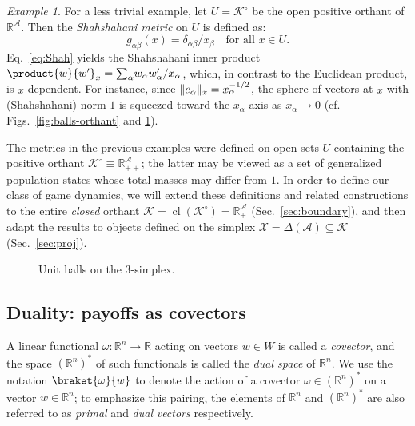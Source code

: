 \documentclass[reqno]{amsart}
\DeclarePairedDelimiter{\norm}{\lVert}{\rVert}
\theoremstyle{plain}
\theoremstyle{definition}
\theoremstyle{remark}
\newtheorem{example}[theorem]{Example}
\numberwithin{equation}{section}
\numberwithin{theorem}{section}
\begin{document}
\begin{example}
\label{ex:Shah}
For a less trivial example, let ${U} = {{\mathcal{K}}^{\circ}}$ be the open positive orthant of ${\mathbb{R}}^{\mathcal{A}}$.
Then the \emph{Shahshahani metric} on ${U}$ is defined as:
\begin{equation}
\label{eq:Shah}
g_{\alpha\beta}(x)
	= \delta_{\alpha\beta}/x_{\beta}
	\quad
	\text{for all $x\in{U}$}.
\end{equation}
Eq.~\eqref{eq:Shah} yields the Shahshahani inner product $\product{w}{w'}_{x} = {\sum\nolimits}_{\alpha} w_{\alpha} w_{\alpha}'/x_{\alpha}$, which, in contrast to the Euclidean product, is $x$-dependent.
For instance, since $\norm{{e}_{\alpha}}_{x} = x_{\alpha}^{-1/2}$, the sphere of vectors at $x$ with (Shahshahani) norm $1$ is squeezed toward the $x_{\alpha}$ axis as $x_{\alpha}\to 0$ (cf. Figs.~\ref{fig:balls-orthant} and \ref{fig:balls-simplex}).
\end{example}

The metrics in the previous examples were defined on open sets ${U}$ containing the positive orthant ${{\mathcal{K}}^{\circ}} \equiv {\mathbb{R}}_{++}^{\mathcal{A}}$;
the latter may be viewed as a set of generalized population states whose total masses may differ from $1$.
In order to define our class of game dynamics, we will extend these definitions and related constructions to the entire \emph{closed} orthant ${\mathcal{K}} = \operatorname{cl}({{\mathcal{K}}^{\circ}}) = {\mathbb{R}}_{+}^{\mathcal{A}}$ (Sec.~\ref{sec:boundary}), and then adapt the results to objects defined on the simplex ${\mathcal{X}} = {\Delta}({\mathcal{A}}) \subseteq {\mathcal{K}}$ (Sec.~\ref{sec:proj}). 

\begin{figure}[t]
\hfill
{} 
\caption{\small
Unit balls on the $3$-simplex.
}
\label{fig:balls-simplex}
\end{figure}

\subsection{Duality: payoffs as covectors}
\label{sec:dual}

A linear functional $\omega{\colon}{{\mathbb{R}}^{n}}\to{\mathbb{R}}$ acting on vectors $w \in W$ is called a \emph{covector}, and the space ${({\mathbb{R}}^{n})^{\ast}}$ of such functionals is called the \emph{dual space} of ${{\mathbb{R}}^{n}}$.
We use the notation $\braket{\omega}{w}$ to denote the action of a covector $\omega \in {({\mathbb{R}}^{n})^{\ast}}$ on a vector $w \in {{\mathbb{R}}^{n}}$;
to emphasize this pairing, the elements of ${{\mathbb{R}}^{n}}$ and ${({\mathbb{R}}^{n})^{\ast}}$ are also referred to as \emph{primal} and \emph{dual} \emph{vectors} respectively.
\end{document}
